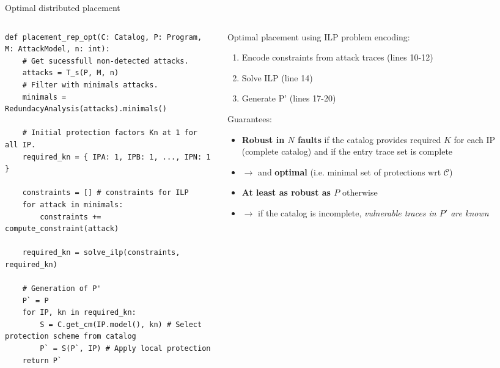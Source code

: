 \begin{frame}[fragile]{Optimal distributed placement}
    \begin{columns}
        \begin{column}{0.5\textwidth}
            \begin{tiny}
                \lstset{style=custompython}
                \begin{lstlisting}
def placement_rep_opt(C: Catalog, P: Program, M: AttackModel, n: int):
    # Get sucessfull non-detected attacks.
    attacks = T_s(P, M, n)
    # Filter with minimals attacks.
    minimals = RedundacyAnalysis(attacks).minimals()
    
    # Initial protection factors Kn at 1 for all IP.
    required_kn = { IPA: 1, IPB: 1, ..., IPN: 1 }
    
    constraints = [] # constraints for ILP
    for attack in minimals:
        constraints += compute_constraint(attack)
    
    required_kn = solve_ilp(constraints, required_kn)
    
    # Generation of P'
    P` = P
    for IP, kn in required_kn:
        S = C.get_cm(IP.model(), kn) # Select protection scheme from catalog
        P` = S(P`, IP) # Apply local protection        
    return P`   \end{lstlisting}
            \end{tiny}
        \end{column}
        \begin{column}{0.5\textwidth}
            \begin{tiny}
                Optimal placement using ILP problem encoding:
                \begin{enumerate}
                    \item Encode constraints from attack traces (lines 10-12)
                    \item Solve ILP (line 14)
                    \item Generate P' (lines 17-20)
                \end{enumerate}
    
                \vspace{0.6cm}
                Guarantees:
                \begin{itemize}
                    \item \textbf{Robust in $N$ faults} if the catalog provides required $K$ for each IP (complete catalog) and if the entry trace set is complete
                    \item[] $\rightarrow$ and \textbf{optimal} (i.e. minimal set of protections wrt $\mathcal{C}$) 
                    \item \textbf{At least as robust as $P$} otherwise
                    \item[] $\rightarrow$ if the catalog is incomplete, \textit{vulnerable traces in $P'$ are known}
                \end{itemize}        
                \vfill
            \end{tiny}
        \end{column}
    \end{columns}
\end{frame}

